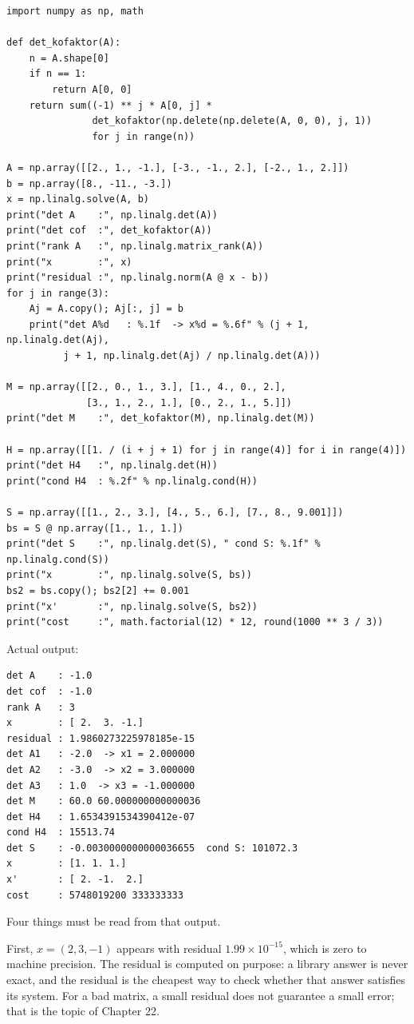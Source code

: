 \begin{lab}
\begin{verbatim}
import numpy as np, math

def det_kofaktor(A):
    n = A.shape[0]
    if n == 1:
        return A[0, 0]
    return sum((-1) ** j * A[0, j] *
               det_kofaktor(np.delete(np.delete(A, 0, 0), j, 1))
               for j in range(n))

A = np.array([[2., 1., -1.], [-3., -1., 2.], [-2., 1., 2.]])
b = np.array([8., -11., -3.])
x = np.linalg.solve(A, b)
print("det A    :", np.linalg.det(A))
print("det cof  :", det_kofaktor(A))
print("rank A   :", np.linalg.matrix_rank(A))
print("x        :", x)
print("residual :", np.linalg.norm(A @ x - b))
for j in range(3):
    Aj = A.copy(); Aj[:, j] = b
    print("det A%d   : %.1f  -> x%d = %.6f" % (j + 1, np.linalg.det(Aj),
          j + 1, np.linalg.det(Aj) / np.linalg.det(A)))

M = np.array([[2., 0., 1., 3.], [1., 4., 0., 2.],
              [3., 1., 2., 1.], [0., 2., 1., 5.]])
print("det M    :", det_kofaktor(M), np.linalg.det(M))

H = np.array([[1. / (i + j + 1) for j in range(4)] for i in range(4)])
print("det H4   :", np.linalg.det(H))
print("cond H4  : %.2f" % np.linalg.cond(H))

S = np.array([[1., 2., 3.], [4., 5., 6.], [7., 8., 9.001]])
bs = S @ np.array([1., 1., 1.])
print("det S    :", np.linalg.det(S), " cond S: %.1f" % np.linalg.cond(S))
print("x        :", np.linalg.solve(S, bs))
bs2 = bs.copy(); bs2[2] += 0.001
print("x'       :", np.linalg.solve(S, bs2))
print("cost     :", math.factorial(12) * 12, round(1000 ** 3 / 3))
\end{verbatim}
Actual output:
\begin{verbatim}
det A    : -1.0
det cof  : -1.0
rank A   : 3
x        : [ 2.  3. -1.]
residual : 1.9860273225978185e-15
det A1   : -2.0  -> x1 = 2.000000
det A2   : -3.0  -> x2 = 3.000000
det A3   : 1.0  -> x3 = -1.000000
det M    : 60.0 60.000000000000036
det H4   : 1.6534391534390412e-07
cond H4  : 15513.74
det S    : -0.0030000000000036655  cond S: 101072.3
x        : [1. 1. 1.]
x'       : [ 2. -1.  2.]
cost     : 5748019200 333333333
\end{verbatim}
\end{lab}

Four things must be read from that output.

First, $x=(2,3,-1)$ appears with residual $1.99\times10^{-15}$, which is zero to machine
precision. The residual is computed on purpose: a library answer is never exact, and the residual
is the cheapest way to check whether that answer satisfies its system. For a bad matrix, a small
residual does not guarantee a small error; that is the topic of Chapter 22.


